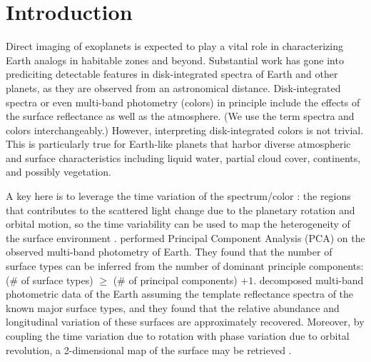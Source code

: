 \documentclass[iop,numberedappendix,apj]{emulateapj}
\begin{document}
  



\section{Introduction}
\label{sec:intro}

Direct imaging of exoplanets is expected to play a vital role in characterizing Earth analogs in habitable zones and beyond. 
Substantial work has gone into prediciting detectable features in disk-integrated spectra of Earth and other planets, as they are observed from an astronomical distance. 
Disk-integrated spectra or even multi-band photometry (colors) in principle include the effects of the surface reflectance as well as the atmosphere. (We use the term spectra and colors interchangeably.) 
However, interpreting disk-integrated colors is not trivial. 
This is particularly true for Earth-like planets that harbor diverse atmospheric and surface characteristics including liquid water, partial cloud cover, continents, and possibly vegetation. 

A key here is to leverage the time variation of the spectrum/color  \citep{Ford2001}: the regions that contributes to the scattered light change due to the planetary rotation and  orbital motion, so the time variability can be used to map the heterogeneity of the surface environment \citep[see][for recent review]{Cowan2017}.  
\citet{Cowan2009, Cowan2011} performed Principal Component Analysis (PCA) on the observed multi-band photometry of Earth. They found that the number of surface types can be inferred from the number of dominant principle components: (\# of surface types) $\ge $ (\# of principal components) $+ 1$. %
\citet{Fujii2010, Fujii2011} decomposed multi-band photometric data of the Earth assuming the template reflectance spectra of the known major surface types, and they found that the relative abundance and longitudinal variation of these surfaces are approximately recovered. 
Moreover, by coupling the time variation due to rotation with phase variation due to orbital revolution, a 2-dimensional map of the surface may be retrieved \citep{Kawahara2010, Kawahara2011, Fujii2012}. 
\end{document}
